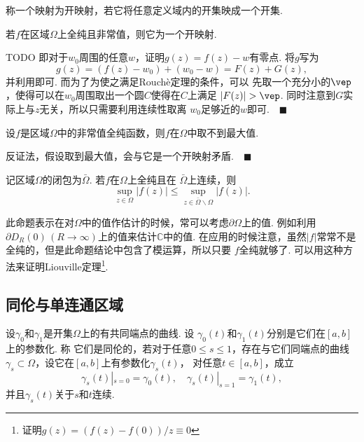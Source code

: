   \begin{defi}[开映射]
    称一个映射为开映射，若它将任意定义域内的开集映成一个开集.
  \end{defi}

  \begin{thm}[开映射]
    若$f$在区域$\Omega$上全纯且非常值，则它为一个开映射.
  \end{thm}
  \remark
    TODO
  \proof
    即对于$w_0$周围的任意$w$，证明$g(z)=f(z)-w$有零点. 将$g$写为
    \[
      g(z) = (f(z)-w_0) + (w_0-w) = F(z) + G(z),
    \]
    并利用即可. 而为了为使之满足Rouchè定理的条件，可以
    先取一个充分小的$\vep$，使得可以在$w_0$周围取出一个圆$C$使得在$C$上满足
    $|F(z)|>\vep$. 同时注意到$G$实际上与$z$无关，所以只需要利用连续性取离
    $w_0$足够近的$w$即可.$\quad\blacksquare$


   \begin{thm}[最大模原理]
    设$f$是区域$\Omega$中的非常值全纯函数，则$f$在$\Omega$中取不到最大值.
  \end{thm}
  \proof
    反证法，假设取到最大值，会与它是一个开映射矛盾.$\quad\blacksquare$

  \begin{cor}
    记区域$\Omega$的闭包为$\bar{\Omega}$. 若$f$在$\Omega$上全纯且在
    $\bar{\Omega}$上连续，则
    \[
      \sup_{z\in\Omega}|f(z)| \le \sup_{z\in\bar{\Omega}\backslash\Omega}|f(z)|.
    \]
  \end{cor}
  \remark
    此命题表示在对$\Omega$中的值作估计的时候，常可以考虑$\partial\Omega$上的值.
    例如利用$\partial D_R(0)\,(R\to\infty)$上的值来估计$\mathbb{C}$中的值. 
    在应用的时候注意，虽然$|f|$常常不是全纯的，但是此命题结论中包含了模运算，所以只要
    $f$全纯就够了.
    可以用这种方法来证明Liouville定理\footnote{证明$g(z)=(f(z)-f(0))/z\equiv 0$}. 


\subsection{同伦与单连通区域}

  \begin{defi}[同伦]
    设$\gamma_0$和$\gamma_1$是开集$\Omega$上的有共同端点的曲线. 设
    $\gamma_0(t)$和$\gamma_1(t)$分别是它们在$[a,b]$上的参数化. 称
    它们是同伦的，若对于任意$0\le s\le 1$，存在与它们同端点的曲线
    $\gamma_s\subset\Omega$，设它在$[a,b]$上有参数化$\gamma_s(t)$，
    对任意$t\in [a,b]$，成立
    \[
      \gamma_s(t)|_{s=0} = \gamma_0(t),\quad 
      \gamma_s(t)|_{s=1} = \gamma_1(t),
    \]
    并且$\gamma_s(t)$关于$s$和$t$连续.
  \end{defi}


